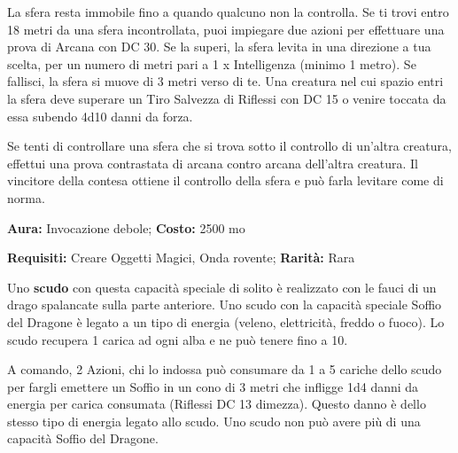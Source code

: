 \begin{multicols}{2}
La sfera resta immobile fino a quando qualcuno non la controlla. Se ti trovi entro 18 metri da una sfera incontrollata, puoi impiegare due azioni per effettuare una prova di Arcana con DC 30. Se la superi, la sfera levita in una direzione a tua scelta, per un numero di metri pari a 1 x Intelligenza (minimo 1 metro). Se fallisci, la sfera si muove di 3 metri verso di te. Una creatura nel cui spazio entri la sfera deve superare un Tiro Salvezza di Riflessi con DC 15 o venire toccata da essa subendo 4d10 danni da forza.

Se tenti di controllare una sfera che si trova sotto il controllo di un'altra creatura, effettui una prova contrastata di arcana contro arcana dell'altra creatura. Il vincitore della contesa ottiene il controllo della sfera e può farla levitare come di norma.



%



\textbf{Aura:} Invocazione debole; \textbf{Costo:} 2500 mo

\textbf{Requisiti:} Creare Oggetti Magici, Onda rovente; \textbf{Rarità:} Rara

Uno \textbf{scudo} con questa capacità speciale di solito è realizzato con le fauci di un drago spalancate sulla parte anteriore. Uno scudo con la capacità speciale Soffio del Dragone è legato a un tipo di energia (veleno, elettricità, freddo o fuoco). Lo scudo recupera 1 carica ad ogni alba e ne può tenere fino a 10.

A comando, 2 Azioni, chi lo indossa può consumare da 1 a 5 cariche dello scudo per fargli emettere un Soffio in un cono di 3 metri che infligge 1d4 danni da energia per carica consumata (Riflessi DC 13 dimezza). Questo danno è dello stesso tipo di energia legato allo scudo. Uno scudo non può avere più di una capacità Soffio del Dragone.


\end{multicols}
